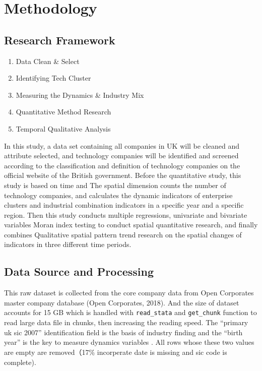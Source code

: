 \documentclass[
  12pt,
  oneside]{book}
\providecommand{\tightlist}{%
  \setlength{\itemsep}{0pt}\setlength{\parskip}{0pt}}
\begin{document}
\hypertarget{methodology}{%
\chapter{Methodology}\label{methodology}}

\hypertarget{research-framework}{%
\section{Research Framework}\label{research-framework}}

\begin{enumerate}
\def\labelenumi{\arabic{enumi}.}
\tightlist
\item
  Data Clean \& Select
\item
  Identifying Tech Cluster
\item
  Measuring the Dynamics \& Industry Mix
\item
  Quantitative Method Research
\item
  Temporal Qualitative Analysis
\end{enumerate}

In this study, a data set containing all companies in UK will be cleaned and attribute selected, and technology companies will be identified and screened according to the classification and definition of technology companies on the official website of the British government. Before the quantitative study, this study is based on time and The spatial dimension counts the number of technology companies, and calculates the dynamic indicators of enterprise clusters and industrial combination indicators in a specific year and a specific region. Then this study conducts multiple regressions, univariate and bivariate variables Moran index testing to conduct spatial quantitative research, and finally combines Qualitative spatial pattern trend research on the spatial changes of indicators in three different time periods.

\hypertarget{data-source-and-processing}{%
\section{Data Source and Processing}\label{data-source-and-processing}}

This raw dataset is collected from the core company data from Open Corporates master company database (Open Corporates, 2018). And the size of dataset accounts for 15 GB which is handled with \texttt{read\_stata} and \texttt{get\_chunk} function to read large data file in chunks, then increasing the reading speed. The ``primary uk sic 2007'' identification field is the basis of industry finding and the ``birth year'' is the key to measure dynamics variables . All rows whose these two values are empty are removed（17\% incorperate date is missing and sic code is complete).
\end{document}
